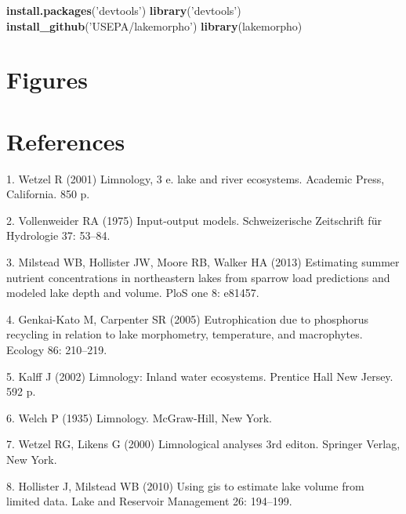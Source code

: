 \documentclass[11pt,]{article}
\newenvironment{Shaded}{\begin{snugshade}}{\end{snugshade}}
\newcommand{\KeywordTok}[1]{\textcolor[rgb]{0.13,0.29,0.53}{\textbf{{#1}}}}
\newcommand{\StringTok}[1]{\textcolor[rgb]{0.31,0.60,0.02}{{#1}}}
\newcommand{\NormalTok}[1]{{#1}}
\begin{document}
\begin{Shaded}
\begin{Highlighting}[]
\KeywordTok{install.packages}\NormalTok{(}\StringTok{'devtools'}\NormalTok{)}
\KeywordTok{library}\NormalTok{(}\StringTok{'devtools'}\NormalTok{)}
\KeywordTok{install_github}\NormalTok{(}\StringTok{'USEPA/lakemorpho'}\NormalTok{)}
\KeywordTok{library}\NormalTok{(lakemorpho)}
\end{Highlighting}
\end{Shaded}

\section{Figures}\label{figures}

\section*{References}\label{references}

\hypertarget{refs}{}
\hypertarget{ref-wetzel2001limnology}{}
1. Wetzel R (2001) Limnology, 3 e. lake and river ecosystems. Academic
Press, California. 850 p.

\hypertarget{ref-vollenweider1975input}{}
2. Vollenweider RA (1975) Input-output models. Schweizerische
Zeitschrift für Hydrologie 37: 53--84.

\hypertarget{ref-milstead2013estimating}{}
3. Milstead WB, Hollister JW, Moore RB, Walker HA (2013) Estimating
summer nutrient concentrations in northeastern lakes from sparrow load
predictions and modeled lake depth and volume. PloS one 8: e81457.

\hypertarget{ref-genkai2005eutrophication}{}
4. Genkai-Kato M, Carpenter SR (2005) Eutrophication due to phosphorus
recycling in relation to lake morphometry, temperature, and macrophytes.
Ecology 86: 210--219.

\hypertarget{ref-kalff2002limnology}{}
5. Kalff J (2002) Limnology: Inland water ecosystems. Prentice Hall New
Jersey. 592 p.

\hypertarget{ref-welch1935limnology}{}
6. Welch P (1935) Limnology. McGraw-Hill, New York.

\hypertarget{ref-wetzel2000limnological}{}
7. Wetzel RG, Likens G (2000) Limnological analyses 3rd editon. Springer
Verlag, New York.

\hypertarget{ref-hollister2010volume}{}
8. Hollister J, Milstead WB (2010) Using gis to estimate lake volume
from limited data. Lake and Reservoir Management 26: 194--199.
\end{document}
